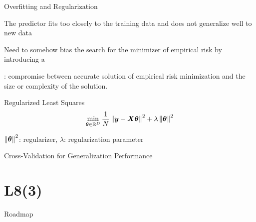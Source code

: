 \documentclass[handout,fleqn,aspectratio=169]{beamer}
\begin{document}
\begin{frame}{Overfitting and Regularization}

\plitemsep 0.07in

\bci 

\item The predictor fits too closely to the training data and does not generalize well to new data

\item Need to somehow bias the search for the minimizer of empirical risk by introducing a 

\item {}: compromise between accurate solution of empirical risk minimization and the size or complexity of the solution.

\item \exam Regularized Least Squares
$$
\min_{\bm{\theta} \in {\mathbb R}^{D}} \frac{1}{N} \left \lVert \bm{y} - \bm{X}\bm{\theta} \right \rVert^2 + \lambda \left \lVert \bm{\theta} \right \rVert^2
$$
\bci
\item $\left \lVert \bm{\theta} \right \rVert^2$: regularizer, $\lambda$: regularization parameter
\eci

\eci
\end{frame}

\begin{frame}{Cross-Validation for Generalization Performance}

\bigskip



\end{frame}


\section{L8(3)}
\begin{frame}{Roadmap}

\plitemsep 0.1in

\bce[(1)] 

\item {}
\item {} 
\item {}
\item {}

\ece
\end{frame}
\end{document}

